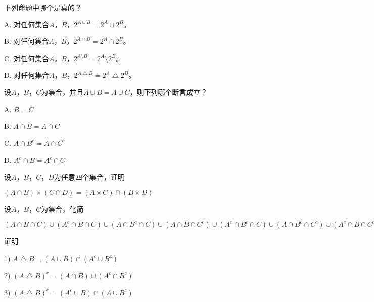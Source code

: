   \begin{Exercise}
下列命题中哪个是真的？

A. 对任何集合$A$，$B$，$2^{A\cup B} = 2^A \cup 2^B$。

B. 对任何集合$A$，$B$，$2^{A\cap B} = 2^A \cap 2^B$。

C. 对任何集合$A$，$B$，$2^{A\setminus B} = 2^A \setminus 2^B$。

D. 对任何集合$A$，$B$，$2^{A\bigtriangleup B} = 2^A \bigtriangleup 2^B$。
  \end{Exercise}
  \begin{Exercise}
    设$A$，$B$，$C$为集合，并且$A\cup B = A \cup C$，则下列哪个断言成立？

    A. $B = C$

    B. $A \cap B = A \cap C$

    C. $A \cap B^c = A \cap C^c$

    D. $A^c \cap B = A^c \cap C$
  \end{Exercise}
  \begin{Exercise}
    设$A$，$B$，$C$，$D$为任意四个集合，证明

    $(A \cap B) \times (C \cap D) =
    (A\times C) \cap (B \times D)$
  \end{Exercise}
  \begin{Exercise}
   设$A$，$B$，$C$为集合，化简

$(A \cap B \cap C)\cup (A^c \cap B \cap C) \cup (A \cap B^c \cap C) \cup (A \cap B \cap C^c) \cup (A^c \cap B^c \cap C) \cup (A \cap B^c \cap C^c) \cup (A^c \cap B \cap C^c)$
  \end{Exercise}
  \begin{Exercise}
   证明

1) $A\bigtriangleup B = (A\cup B) \cap (A^c \cup B^c)$

2) $(A \bigtriangleup B)^c = (A \cap B) \cup (A^c \cap B^c)$

3) $(A \bigtriangleup B)^c = (A^c \cup B) \cap (A \cup B^c)$
\end{Exercise}

